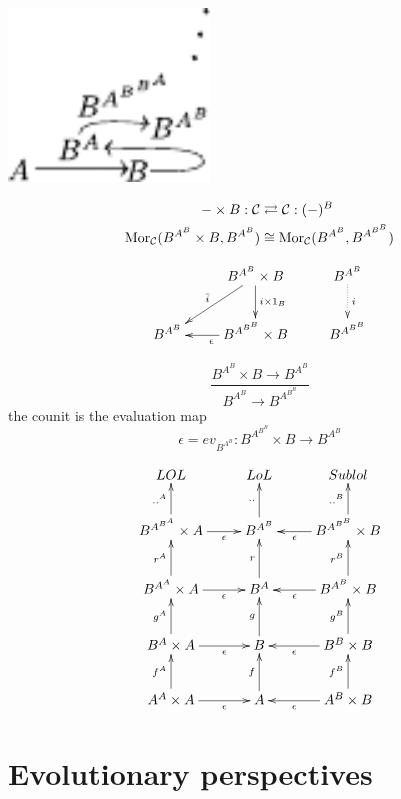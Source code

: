 \documentclass[aps,twocolumn]{revtex4-1}
\begin{document}
		
	\begin{center}
		\includegraphics[width=0.4\textwidth]{fig/mrcatinf.pdf}
	\end{center}

\begin{align*}
- \times B: \mathcal{C} & \rightleftarrows \mathcal{C}: (-)^B\\
\mathop{\rm Mor}\nolimits_{\mathcal{C}}(B^{A^B} \times B, B^{A^B}) & \cong  \mathop{\rm Mor}\nolimits_{\mathcal{C}}(B^{A^B}, B^{A^{B^B}})
\end{align*}

			$$
			\xymatrix{
			& B^{A^B} \times B \ar[d]^-{i \times 1_B} \ar[dl]_{\bar{i}} & B^{A^B} \ar@{.>}[d]^-{i}\\
			B^{A^B} & B^{A^{B^B}} \times B \ar[l]^{\epsilon} & B^{A^{B^B}}
			}
			$$
	
		$$
			\frac{B^{A^B} \times B \longrightarrow B^{A^B}}{B^{A^B} \longrightarrow B^{A^{B^B}}}
		$$
		the counit is the evaluation map
		$$
			\epsilon = ev_{B^{A^B}} \colon B^{A^{B^B}} \times B \longrightarrow B^{A^B}
		$$
	



$$
			\xymatrix{
			 LOL &LoL &Sublol \\
			  B^{A^{B^A}} \times A \ar[r]_-{\epsilon} \ar[u]^-{..^A} & B^{A^B} \ar[u]^-{..} & B^{A^{B^B}} \times B\ar[l]^-{\epsilon}\ar[u]^-{..^B} \\
			 B^{A^A} \times A \ar[r]_-{\epsilon} \ar[u]^-{r^A} & B^A \ar[u]^-{r} & B^{A^B} \times B\ar[l]^-{\epsilon}\ar[u]^-{r^B} \\
			B^A \times A \ar[r]_-{\epsilon} \ar[u]^-{g^A} & B \ar[u]^-{g} & B^B \times B\ar[l]^-{\epsilon}\ar[u]^-{g^B} \\
			A^A \times A \ar[r]_-{\epsilon} \ar[u]^-{f^A} & 
			A\ar[u]^-{f} & A^B\times B\ar[l]^-{\epsilon}\ar[u]^-{f^B} }
			$$


	
\section{Evolutionary perspectives}
\end{document}
